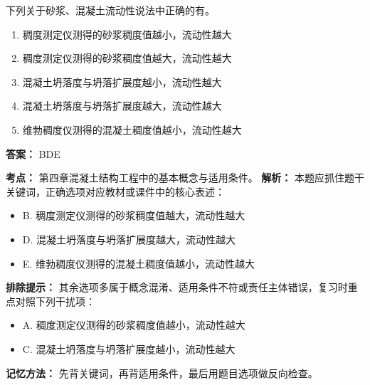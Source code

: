 \documentclass[UTF8,fontset=fandol,11pt]{ctexart}
\begin{document}
\vspace{0.2em}

\begin{quizbox}[title={第 55 题}]
下列关于砂浆、混凝土流动性说法中正确的有。\\
\begin{enumerate}[label=\Alph*.]
\item 稠度测定仪测得的砂浆稠度值越小，流动性越大
\item 稠度测定仪测得的砂浆稠度值越大，流动性越大
\item 混凝土坍落度与坍落扩展度越小，流动性越大
\item 混凝土坍落度与坍落扩展度越大，流动性越大
\item 维勃稠度仪测得的混凝土稠度值越小，流动性越大
\end{enumerate}
\textbf{答案：} BDE
\vspace{0.25em}
\begin{answerbox}[title={考点解析}]
\textbf{考点：} 第四章混凝土结构工程中的基本概念与适用条件。
\textbf{解析：} 本题应抓住题干关键词，正确选项对应教材或课件中的核心表述：
\begin{itemize}
\item B. 稠度测定仪测得的砂浆稠度值越大，流动性越大
\item D. 混凝土坍落度与坍落扩展度越大，流动性越大
\item E. 维勃稠度仪测得的混凝土稠度值越小，流动性越大
\end{itemize}
\textbf{排除提示：} 其余选项多属于概念混淆、适用条件不符或责任主体错误，复习时重点对照下列干扰项：
\begin{itemize}
\item A. 稠度测定仪测得的砂浆稠度值越小，流动性越大
\item C. 混凝土坍落度与坍落扩展度越小，流动性越大
\end{itemize}
\textbf{记忆方法：} 先背关键词，再背适用条件，最后用题目选项做反向检查。
\end{answerbox}
\end{quizbox}

\vspace{0.2em}
\end{document}
